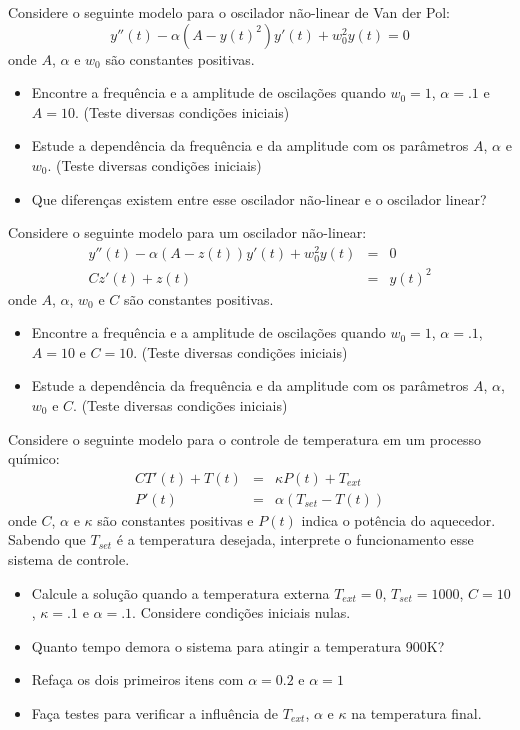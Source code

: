 \begin{Exercise} Considere o seguinte modelo para o oscilador não-linear de Van der Pol:
$$y''(t) - \alpha (A-y(t)^2)y'(t) + w_0^2y(t)=0$$
onde $A$, $\alpha$ e $w_0$ são constantes positivas.
\begin{itemize}
\item Encontre a frequência e a amplitude de oscilações quando $w_0=1$, $\alpha=.1$ e $A=10$. (Teste diversas condições iniciais)
\item Estude a dependência da frequência e da amplitude com os parâmetros  $A$, $\alpha$ e $w_0$. (Teste diversas condições iniciais)
\item Que diferenças existem entre esse oscilador não-linear e o oscilador linear?
\end{itemize}
\end{Exercise}

\begin{Exercise} Considere o seguinte modelo para um oscilador não-linear:
\begin{eqnarray*}
y''(t)-\alpha(A-z(t))y'(t)+w_0^2 y(t)&=&0\\
Cz'(t)+z(t)&=&y(t)^2
\end{eqnarray*}
onde $A$, $\alpha$, $w_0$ e $C$ são constantes positivas.
\begin{itemize}
\item Encontre a frequência e a amplitude de oscilações quando $w_0=1$, $\alpha=.1$, $A=10$ e $C=10$. (Teste diversas condições iniciais)
\item Estude a dependência da frequência e da amplitude com os parâmetros  $A$, $\alpha$, $w_0$ e $C$. (Teste diversas condições iniciais)
\end{itemize}
\end{Exercise}

\begin{Exercise} Considere o seguinte modelo para o controle de temperatura em um processo químico:
\begin{eqnarray*}
CT'(t)+T(t)&=&\kappa P(t)+T_{ext}\\
P'(t)&=&\alpha(T_{set}-T(t))
\end{eqnarray*}
onde $C$, $\alpha$ e $\kappa$ são constantes positivas e $P(t)$ indica o potência do aquecedor. Sabendo que $T_{set}$ é a temperatura desejada, interprete o funcionamento esse sistema de controle.
\begin{itemize}
\item Calcule a solução quando a temperatura externa $T_{ext}=0$, $T_{set}=1000$, $C=10$, $\kappa=.1$ e $\alpha=.1$. Considere condições iniciais nulas.
\item Quanto tempo demora o sistema para atingir a temperatura 900K?
\item Refaça os dois primeiros itens com $\alpha=0.2$ e $\alpha=1$
\item Faça testes para verificar a influência de $T_{ext}$, $\alpha$ e $\kappa$ na temperatura final.
\end{itemize}
\end{Exercise}

